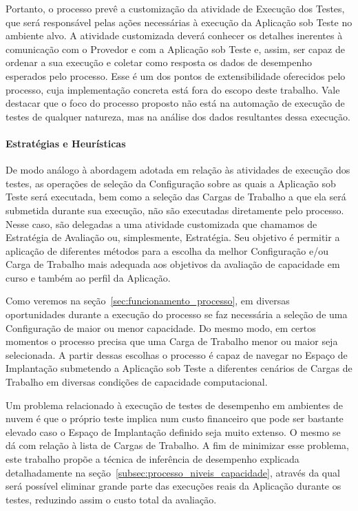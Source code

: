 \documentclass[12pt]{article}
\begin{document}

Portanto, o processo prevê a customização da atividade de Execução dos Testes,
que será responsável pelas ações necessárias à execução da Aplicação sob Teste no ambiente
alvo. A atividade customizada deverá conhecer os detalhes inerentes à comunicação com 
o Provedor e com a Aplicação sob Teste e, assim, ser capaz de ordenar a sua execução e 
coletar como resposta os dados de desempenho esperados pelo processo. Esse é um dos 
pontos de extensibilidade oferecidos pelo processo, cuja implementação concreta está 
fora do escopo deste trabalho. Vale destacar que o foco do processo proposto não está na automação de execução de testes de qualquer natureza, mas na análise dos dados resultantes dessa execução.

\paragraph{Estratégias e Heurísticas}
\label{subsubsec:heuristicas}
De modo análogo à abordagem adotada em relação às atividades de execução dos
testes, as operações de seleção da Configuração sobre as quais a Aplicação
sob Teste será executada, bem como a seleção das Cargas de Trabalho a que ela 
será submetida durante sua execução, não são executadas diretamente pelo processo.
Nesse caso, são delegadas a uma atividade customizada que chamamos de Estratégia de 
Avaliação ou, simplesmente, Estratégia. Seu objetivo é permitir a aplicação de 
diferentes métodos para a escolha da melhor Configuração e/ou Carga de Trabalho 
mais adequada aos objetivos da avaliação de capacidade em curso e também ao perfil 
da Aplicação.

Como veremos na seção~\ref{sec:funcionamento_processo}, em diversas oportunidades
durante a execução do processo se faz necessária a seleção de uma Configuração de
maior ou menor capacidade. Do mesmo modo, em certos momentos o processo precisa
que uma Carga de Trabalho menor ou maior seja selecionada. A partir dessas escolhas
o processo é capaz de navegar no Espaço de Implantação submetendo a Aplicação sob
Teste a diferentes cenários de Cargas de Trabalho em diversas condições de capacidade
computacional.

Um problema relacionado à execução de testes de desempenho em ambientes de nuvem
é que o próprio teste implica num custo financeiro que pode ser bastante elevado
caso o Espaço de Implantação definido seja muito extenso. O mesmo se dá com 
relação à lista de Cargas de Trabalho. A fim de minimizar esse problema, este
trabalho propõe a técnica de inferência de desempenho explicada
detalhadamente na seção~\ref{subsec:processo_niveis_capacidade}, através da
qual será possível eliminar grande parte das execuções reais da Aplicação
durante os testes, reduzindo assim o custo total da avaliação.
\end{document}
